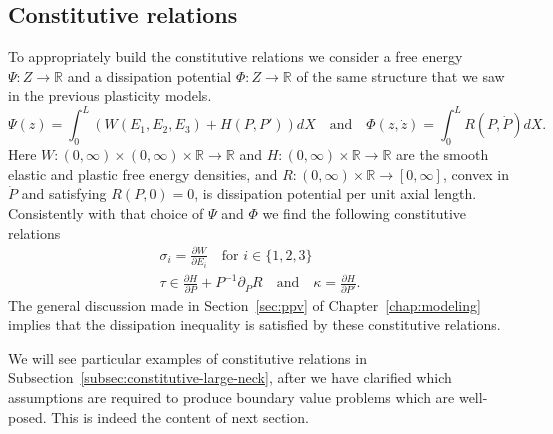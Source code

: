 \documentclass[a4paper,10pt,oneside]{amsbook}
\numberwithin{section}{chapter}
\numberwithin{equation}{chapter}
\theoremstyle{definition}
\newtheorem{prop}{Proposition}[chapter]
\newcommand{\dind}[2]{\frac{\partial #1}{\partial #2}}
\begin{document}
\subsection{Constitutive relations}

To appropriately build the constitutive relations we consider a free energy $\Psi\colon Z\to\mathbb{R}$ and a dissipation potential $\Phi\colon Z\to\mathbb{R}$ of the same structure that we saw in the previous plasticity models.
\begin{equation}
\Psi(z)=\int_0^L\left(W(E_1,E_2,E_3)+H(P,P')\right)dX\quad\text{and}\quad\Phi(z,\dot z)=\int_0^LR(P,\dot P)dX.
\end{equation}
Here $W\colon(0,\infty)\times(0,\infty)\times\mathbb{R}\to\mathbb{R}$ and $H\colon(0,\infty)\times\mathbb{R}\to\mathbb{R}$ are the smooth elastic and plastic free energy densities, and $R\colon(0,\infty)\times\mathbb{R}\to[0,\infty]$, convex in $\dot P$ and satisfying $R(P,0)=0$, is dissipation potential per unit axial length. Consistently with that choice of $\Psi$ and $\Phi$ we find the following constitutive relations
\begin{subequations}
\label{eqn:constitutive-neck-large}
\begin{gather}
\sigma_i=\dind{W}{E_i}\quad\text{for $i\in\{1,2,3\}$} \\
\tau\in\dind{H}{P}+P^{-1}\partial_{\dot P}R\quad\text{and}\quad\kappa=\dind{H}{P'}.
\end{gather}
\end{subequations}
The general discussion made in Section~\ref{sec:ppv} of Chapter~\ref{chap:modeling} implies that the dissipation inequality is satisfied by these constitutive relations.

We will see particular examples of constitutive relations in Subsection~\ref{subsec:constitutive-large-neck}, after we have clarified which assumptions are required to produce boundary value problems which are well-posed. This is indeed the content of next section.
\end{document}
